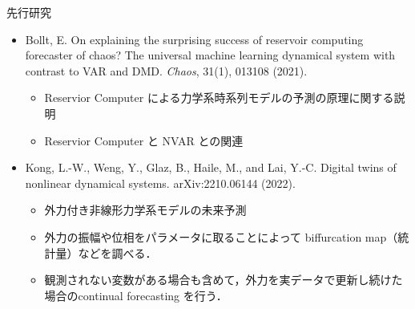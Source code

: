 \begin{frame}{先行研究}
    \begin{itemize}
        \item Bollt, E. On explaining the surprising success of reservoir computing forecaster of chaos? The universal machine learning dynamical system with contrast to VAR and DMD. \textit{Chaos}, 31(1), 013108 (2021). 
            \begin{itemize}
            \item Reservior Computer による力学系時系列モデルの予測の原理に関する説明
            \item Reservior Computer と NVAR との関連
        \end{itemize}
        \item Kong, L.-W., Weng, Y., Glaz, B., Haile, M., and Lai, Y.-C. Digital twins of nonlinear dynamical systems. arXiv:2210.06144 (2022).
            \begin{itemize}
            \item 外力付き非線形力学系モデルの未来予測
            \item 外力の振幅や位相をパラメータに取ることによって biffurcation map（統計量）などを調べる．
            \item 観測されない変数がある場合も含めて，外力を実データで更新し続けた場合のcontinual forecasting を行う．
        \end{itemize}
    \end{itemize}
\end{frame}

